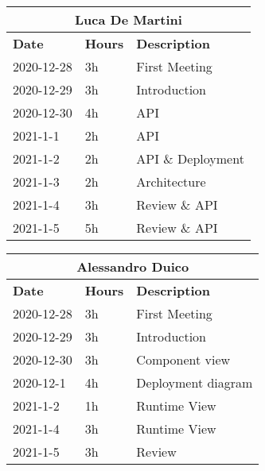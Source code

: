 
\begin{table}[H]
    \centering
    \begin{tabular}{|l|l|l|}
        \multicolumn{3}{c}{\textbf{Luca De Martini}}                   \\
        \hline
        \textbf{Date} & \textbf{Hours} & \textbf{Description}          \\\hline
        2020-12-28    & 3h             & First Meeting       \\\hline
        2020-12-29    & 3h             & Introduction       \\\hline
        2020-12-30    & 4h             & API       \\\hline
        2021-1-1    & 2h             & API       \\\hline
        2021-1-2    & 2h             & API \& Deployment       \\\hline
        2021-1-3    & 2h             & Architecture       \\\hline
        2021-1-4    & 3h             & Review \& API       \\\hline
        2021-1-5    & 5h             & Review \& API       \\\hline
    \end{tabular}
\end{table}
\begin{table}[H]
    \centering
    \begin{tabular}{|l|l|l|}
        \multicolumn{3}{c}{\textbf{Alessandro Duico}}                      \\
        \hline
        \textbf{Date} & \textbf{Hours} & \textbf{Description}              \\\hline
        2020-12-28    & 3h             & First Meeting           \\\hline
        2020-12-29    & 3h             & Introduction       \\\hline
        2020-12-30    & 3h             & Component view     \\\hline
        2020-12-1     & 4h             & Deployment diagram \\\hline
        2021-1-2     & 1h             & Runtime View   \\\hline
        2021-1-4     & 3h             & Runtime View   \\\hline
        2021-1-5     & 3h             & Review \\\hline
    \end{tabular}
\end{table}
